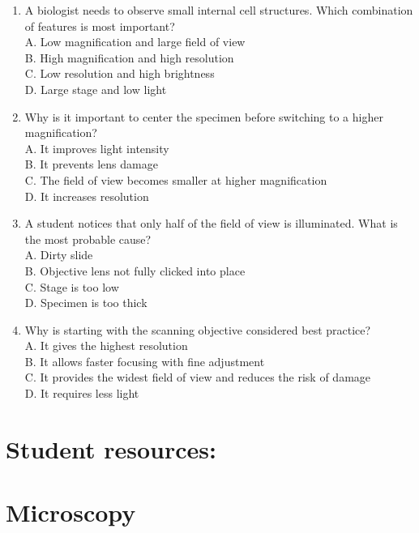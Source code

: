 \documentclass[
  letterpaper,
  DIV=11,
  numbers=noendperiod]{scrreprt}
\begin{document}
\begin{enumerate}
  A. Used the wrong lens\\
  B. Turned the light off\\
  C. Used coarse focus at high magnification\\
  D. Did not center the specimen
\item
  A biologist needs to observe small internal cell structures. Which
  combination of features is most important?\\
  A. Low magnification and large field of view\\
  B. High magnification and high resolution\\
  C. Low resolution and high brightness\\
  D. Large stage and low light
\item
  Why is it important to center the specimen before switching to a
  higher magnification?\\
  A. It improves light intensity\\
  B. It prevents lens damage\\
  C. The field of view becomes smaller at higher magnification\\
  D. It increases resolution
\item
  A student notices that only half of the field of view is illuminated.
  What is the most probable cause?\\
  A. Dirty slide\\
  B. Objective lens not fully clicked into place\\
  C. Stage is too low\\
  D. Specimen is too thick
\item
  Why is starting with the scanning objective considered best
  practice?\\
  A. It gives the highest resolution\\
  B. It allows faster focusing with fine adjustment\\
  C. It provides the widest field of view and reduces the risk of
  damage\\
  D. It requires less light
\end{enumerate}

\section{\texorpdfstring{\textbf{Student
resources:}}{Student resources:}}\label{student-resources}

\section{\texorpdfstring{\textbf{Microscopy}}{Microscopy}}\label{microscopy}
\end{document}
